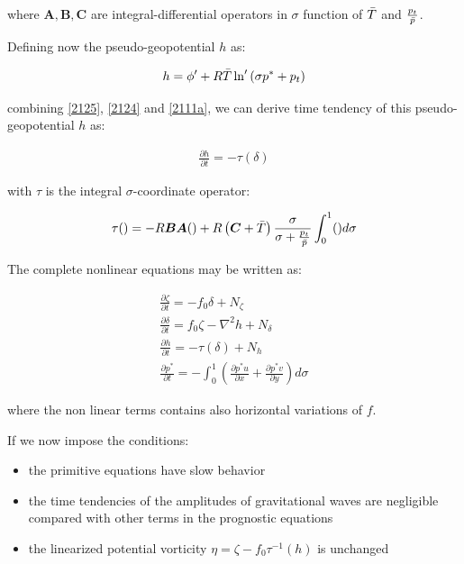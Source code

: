 where $\bm{A}, \bm{B}, \bm{C}$ are integral-differential operators in $\sigma$
function of $\bar{T}$ and $\frac{p_t}{\bar{p}}$.

Defining now the pseudo-geopotential $h$ as:

\begin{gather}
  \label{pseudogeop}
  h = \phi^{\prime} + R \bar{T} \ln^{\prime}
      \left(\sigma p^{\ast} + p_t\right)
\end{gather}

combining \ref{2125}, \ref{2124} and \ref{2111a}, we can derive time tendency
of this pseudo-geopotential $h$ as:

\begin{gather}
  \frac{\partial h}{\partial t} = - \tau(\delta)
\end{gather}

with $\tau$ is the integral $\sigma$-coordinate operator:

\begin{gather}
  \tau( ) = -R \bm{B}\bm{A}( ) + R \left( \bm{C} + \bar{T} \right)
    \frac{\sigma}{\sigma + \frac{p_t}{\bar{p}}}
    \int_0^1 ( ) d\sigma
\end{gather}

The complete nonlinear equations may be written as:

\begin{gather}
  \label{cmplnonlin1}
  \frac{\partial \zeta}{\partial t} = -f_0 \delta + N_{\zeta} \\
  \label{cmplnonlin2}
  \frac{\partial \delta}{\partial t} = f_0 \zeta -
     \nabla^2 h + N_{\delta} \\
  \label{cmplnonlin3}
  \frac{\partial h}{\partial t} = - \tau(\delta) + N_{h} \\
  \frac{\partial p^{\ast}}{\partial t} = -
     \int_0^1 \left(\frac{\partial p^{\ast}u}{\partial x} +
     \frac{\partial p^{\ast} v}{\partial y} \right) d\sigma
\end{gather}

where the non linear terms contains also horizontal variations of $f$.

If we now impose the conditions:

\begin{itemize}
  \item the primitive equations have slow behavior
  \item the time tendencies of the amplitudes of gravitational waves are
    negligible compared with other terms in the prognostic equations
  \item the linearized potential vorticity
    $\eta = \zeta - f_0 \tau^{-1}(h)$ is unchanged
\end{itemize}

